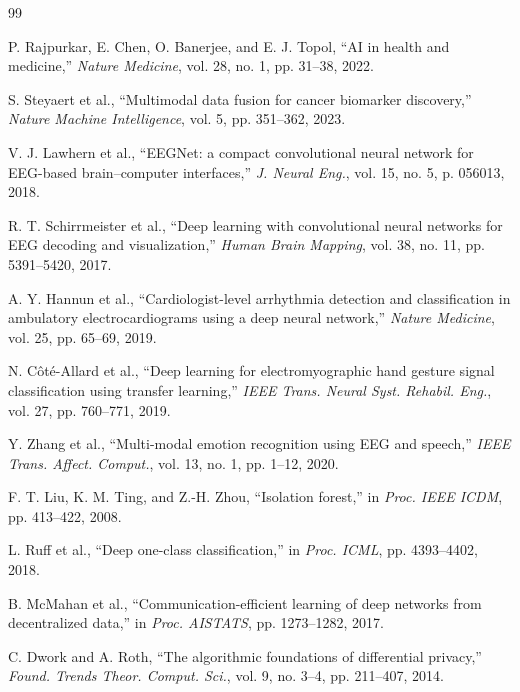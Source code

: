 \documentclass[journal]{IEEEtran}
\begin{document}
\begin{thebibliography}{99}

P. Rajpurkar, E. Chen, O. Banerjee, and E. J. Topol,
``AI in health and medicine,''
\textit{Nature Medicine}, vol. 28, no. 1, pp. 31--38, 2022.

S. Steyaert et al.,
``Multimodal data fusion for cancer biomarker discovery,''
\textit{Nature Machine Intelligence}, vol. 5, pp. 351--362, 2023.

V. J. Lawhern et al.,
``EEGNet: a compact convolutional neural network for EEG-based
brain--computer interfaces,''
\textit{J. Neural Eng.}, vol. 15, no. 5, p. 056013, 2018.

R. T. Schirrmeister et al.,
``Deep learning with convolutional neural networks for EEG decoding
and visualization,''
\textit{Human Brain Mapping}, vol. 38, no. 11, pp. 5391--5420, 2017.

A. Y. Hannun et al.,
``Cardiologist-level arrhythmia detection and classification in
ambulatory electrocardiograms using a deep neural network,''
\textit{Nature Medicine}, vol. 25, pp. 65--69, 2019.

N. Côté-Allard et al.,
``Deep learning for electromyographic hand gesture signal classification
using transfer learning,''
\textit{IEEE Trans. Neural Syst. Rehabil. Eng.}, vol. 27, pp. 760--771, 2019.

Y. Zhang et al.,
``Multi-modal emotion recognition using EEG and speech,''
\textit{IEEE Trans. Affect. Comput.}, vol. 13, no. 1, pp. 1--12, 2020.

F. T. Liu, K. M. Ting, and Z.-H. Zhou,
``Isolation forest,''
in \textit{Proc. IEEE ICDM}, pp. 413--422, 2008.

L. Ruff et al.,
``Deep one-class classification,''
in \textit{Proc. ICML}, pp. 4393--4402, 2018.

B. McMahan et al.,
``Communication-efficient learning of deep networks from decentralized data,''
in \textit{Proc. AISTATS}, pp. 1273--1282, 2017.

C. Dwork and A. Roth,
``The algorithmic foundations of differential privacy,''
\textit{Found. Trends Theor. Comput. Sci.}, vol. 9, no. 3--4, pp. 211--407, 2014.


\end{thebibliography}
\end{document}
